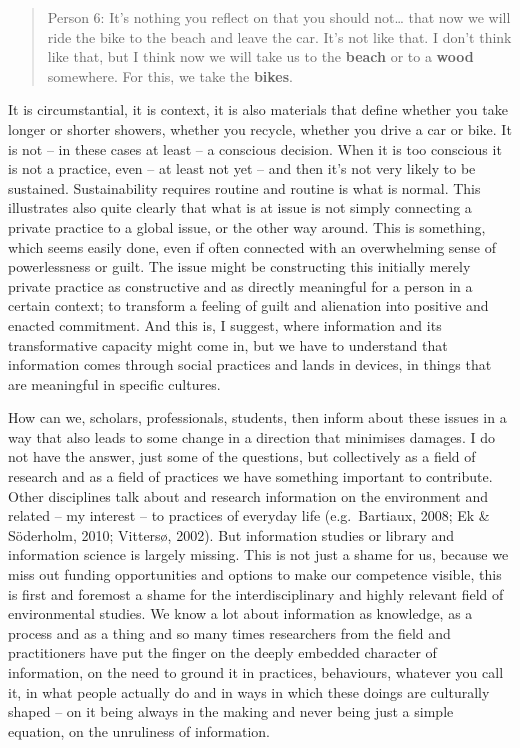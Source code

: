 ﻿\documentclass[a4paper,
fontsize=11pt,
oneside,
numbers=noperiodatend,
parskip=half-,
bibliography=totoc,
final
]{scrartcl}
\begin{document}
\begin{quote}
Person 6: It's nothing you reflect on that you should not\ldots{} that
now we will ride the bike to the beach and leave the car. It's not like
that. I don't think like that, but I think now we will take us to the
\textbf{beach} or to a \textbf{wood} somewhere. For this, we take the
\textbf{bikes}.
\end{quote}

It is circumstantial, it is context, it is also materials that define
whether you take longer or shorter showers, whether you recycle, whether
you drive a car or bike. It is not -- in these cases at least -- a
conscious decision. When it is too conscious it is not a practice, even
-- at least not yet -- and then it's not very likely to be sustained.
Sustainability requires routine and routine is what is normal. This
illustrates also quite clearly that what is at issue is not simply
connecting a private practice to a global issue, or the other way
around. This is something, which seems easily done, even if often
connected with an overwhelming sense of powerlessness or guilt. The
issue might be constructing this initially merely private practice as
constructive and as directly meaningful for a person in a certain
context; to transform a feeling of guilt and alienation into positive
and enacted commitment. And this is, I suggest, where information and
its transformative capacity might come in, but we have to understand
that information comes through social practices and lands in devices, in
things that are meaningful in specific cultures.

How can we, scholars, professionals, students, then inform about these
issues in a way that also leads to some change in a direction that
minimises damages. I do not have the answer, just some of the questions,
but collectively as a field of research and as a field of practices we
have something important to contribute. Other disciplines talk about and
research information on the environment and related -- my interest -- to
practices of everyday life (e.g.~Bartiaux, 2008; Ek \& Söderholm, 2010;
Vittersø, 2002). But information studies or library and information
science is largely missing. This is not just a shame for us, because we
miss out funding opportunities and options to make our competence
visible, this is first and foremost a shame for the interdisciplinary
and highly relevant field of environmental studies. We know a lot about
information as knowledge, as a process and as a thing and so many times
researchers from the field and practitioners have put the finger on the
deeply embedded character of information, on the need to ground it in
practices, behaviours, whatever you call it, in what people actually do
and in ways in which these doings are culturally shaped -- on it being
always in the making and never being just a simple equation, on the
unruliness of information.
\end{document}
